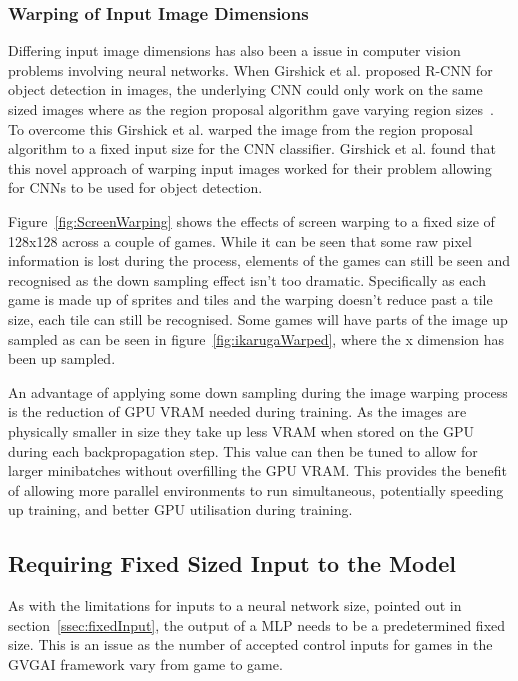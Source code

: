 \subsubsection{Warping of Input Image Dimensions}
Differing input image dimensions has also been a issue in computer vision problems involving neural networks.
When Girshick et al. proposed R-CNN for object detection in images, the underlying CNN could only work on the same sized images where as the region proposal algorithm gave varying region sizes~\cite{RCNN}.
To overcome this Girshick et al. warped the image from the region proposal algorithm to a fixed input size for the CNN classifier.
Girshick et al. found that this novel approach of warping input images worked for their problem allowing for CNNs to be used for object detection.
\par

Figure~\ref{fig:ScreenWarping} shows the effects of screen warping to a fixed size of 128x128 across a couple of games.
While it can be seen that some raw pixel information is lost during the process, elements of the games can still be seen and recognised as the down sampling effect isn't too dramatic.
Specifically as each game is made up of sprites and tiles and the warping doesn't reduce past a tile size, each tile can still be recognised.
Some games will have parts of the image up sampled as can be seen in figure~\ref{fig:ikarugaWarped}, where the x dimension has been up sampled.
\par
An advantage of applying some down sampling during the image warping process is the reduction of GPU VRAM needed during training.
As the images are physically smaller in size they take up less VRAM when stored on the GPU during each backpropagation step.
This value can then be tuned to allow for larger minibatches without overfilling the GPU VRAM.
This provides the benefit of allowing more parallel environments to run simultaneous, potentially speeding up training, and better GPU utilisation during training.

\subsection{Requiring Fixed Sized Input to the Model}
\label{ssec:fixedOutput}
As with the limitations for inputs to a neural network size, pointed out in section~\ref{ssec:fixedInput}, the output of a MLP needs to be a predetermined fixed size.
This is an issue as the number of accepted control inputs for games in the GVGAI framework vary from game to game.
